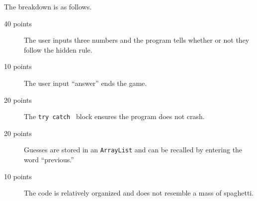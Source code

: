 \documentclass[10pt,letterpaper]{article}
\begin{document}
	The breakdown is as follows.
	
	\begin{description}
		\item[40 points] The user inputs three numbers and the program tells whether or not they follow the hidden rule.
		\item[10 points] The user input ``answer'' ends the game.
		\item[20 points] The \texttt{try catch } block ensures the program does not crash.
		\item[20 points] Guesses are stored in an \texttt{ArrayList} and can be recalled by entering the word ``previous.''
	\item[10 points] The code is relatively organized and does not resemble a mass of spaghetti.
	\end{description}

	
\end{document}
